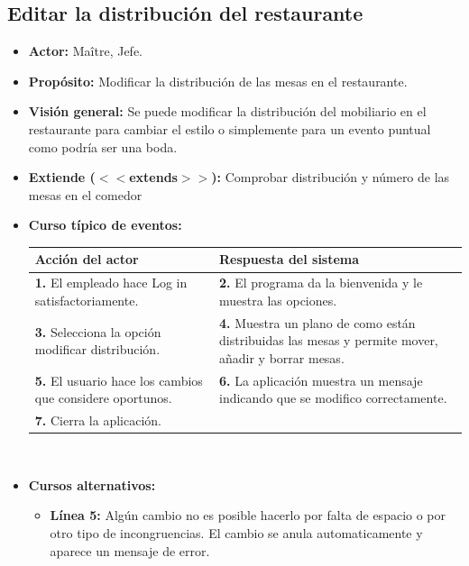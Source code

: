 \documentclass[spanish,a4paper,11pt, twoside]{report}	%
\begin{document}
		\subsection{Editar la distribución del restaurante}
			\begin{itemize}
			\item \textbf{Actor:} Maître, Jefe.
			\item \textbf{Propósito:} Modificar la distribución de las mesas en el restaurante.
			\item \textbf{Visión general:} Se puede modificar la distribución del mobiliario en el restaurante para cambiar el estilo o simplemente para un evento puntual como podría ser una boda.
			\item \textbf{Extiende ($<<$extends$>>$):} Comprobar distribución y número de las mesas en el comedor
			\item \textbf{Curso típico de eventos:} 	\\
				\begin{tabular}{|p{6cm}||p{6cm}|}
				\hline
				\textbf{Acción del actor} & \textbf{Respuesta del sistema} \\ \hline \hline
				\textbf{1.} El empleado hace Log in satisfactoriamente. & \textbf{2.} El programa da la bienvenida y le muestra las opciones. \\ \hline
				\textbf{3.} Selecciona la opción modificar distribución. & \textbf{4.} Muestra un plano de como están distribuidas las mesas y permite mover, añadir y borrar mesas. \\ \hline
				\textbf{5.} El usuario hace los cambios que considere oportunos.	& \textbf{6.} La aplicación muestra un mensaje indicando que se modifico correctamente. \\ \hline
				\textbf{7.} Cierra la aplicación. & \textbf{} \\ \hline
			\end{tabular}
			\\
			\item \textbf{Cursos alternativos:} 
			\begin{itemize}
			\item  \textbf{Línea 5:} Algún cambio no es posible hacerlo por falta de espacio o por otro tipo de incongruencias. El cambio se anula automaticamente y aparece un mensaje de error.
			\end {itemize}
		\end {itemize}

\end{document}
